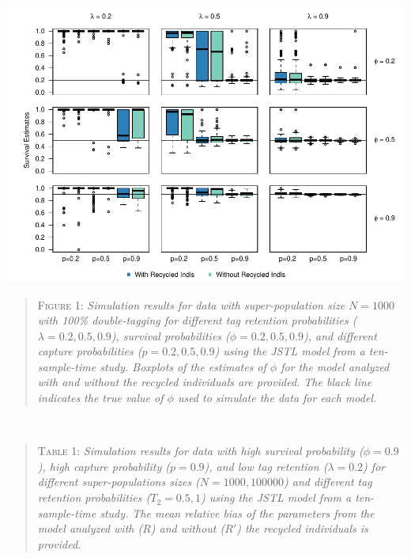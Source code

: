 \documentclass[]{article}
\begin{document}
\includegraphics{RecycledPaper_files/figure-latex/Figure1_survival_GJSTL1-1.pdf}

\begin{quote}
\textsc{Figure 1:}
\textsl{Simulation results for data with super-population size $N=1000$ with 100\% double-tagging for different tag retention probabilities ($\lambda=0.2,0.5,0.9$), survival probabilities ($\phi=0.2,0.5,0.9$), and different capture probabilities ($p=0.2,0.5,0.9$) using the JSTL model from a ten-sample-time study. Boxplots of the estimates of $\phi$ for the model analyzed with and without the recycled individuals are provided. The black line indicates the true value of $\phi$ used to simulate the data for each model.}
\end{quote}

~ ~

\begin{quote}
\textsc{Table 1:}
\textsl{Simulation results for data with high survival probability ($\phi=0.9$), high capture probability ($p=0.9$), and low tag retention ($\lambda=0.2$)  for different super-populations sizes ($N=1000,100000$) and different tag retention probabilities ($T_2=0.5,1$) using the JSTL model from a ten-sample-time study. The mean relative bias of the parameters from the model analyzed with ($R$) and without ($R'$) the recycled individuals is provided.}
\end{quote}
\end{document}
